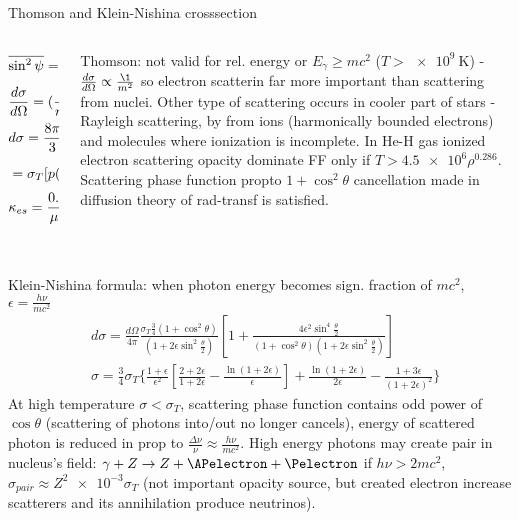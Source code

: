 \begin{frame}{Thomson and Klein-Nishina crosssection}
    \begin{columns}[T]
        \begin{column}{0.6\textwidth}
            \begin{align*}
                &\overline{\sin^2{\psi}}=1-\sin^2{\theta}\overline{cos^2{\phi}}=1-\frac{1}{2}\sin^2{\theta}\tag{unpol.}\\
                &\TDy{\Omega}{\sigma}=(\frac{e^2}{mc^2})^2 \frac{1}{2}(1+\cos^2{\theta})\tag{Thomson}\\
                &d\sigma=\frac{8\pi}{3}(\frac{e^2}{mc^2})^2p(\cos{\theta})\frac{d\Omega}{4\pi}\tag{Norm. scat. phase function}\\
                &=\sigma_T[p(\cos{\theta})\frac{d\Omega}{4\pi}],\sigma_T=\frac{8\pi}{3}(\frac{e^2}{mc^2})^2=\SI{0.665e-24}{\square\cm}\\
                &\kappa_{es}=\frac{0.4}{\mu_e}\approx0.2(1+X_H)\tag{complete ioniz.}\\
                &
            \end{align*}
        \end{column}
        \begin{column}{0.4\textwidth}
            Thomson: not valid for rel. energy or $E_{\gamma}\geq mc^2$ ($T>\SI{e9}{\kelvin}$) - $\TDy{\Omega}{\sigma}\propto \frac{\1}{m^2}$ so electron scatterin far more important than scattering from nuclei.
            Other type of scattering occurs in cooler part of stars - Rayleigh scattering, by from ions (harmonically bounded electrons) and molecules where ionization is incomplete. In He-H gas ionized electron scattering opacity dominate FF only if $T>\num{4.5e6}\rho^{0.286}$. Scattering phase function propto $1+\cos^2{\theta}$ cancellation made in diffusion theory of rad-transf is satisfied.
        \end{column}
    \end{columns}
    Klein-Nishina formula: when photon energy becomes sign. fraction of $mc^2$, $\epsilon=\frac{h\nu}{mc^2}$
    \begin{align*}
        &d\sigma=\frac{d\Omega}{4\pi}\frac{\sigma_T \frac{3}{4}(1+\cos^2{\theta})}{(1+2\epsilon\sin^2{\frac{\theta}{2}})}[1+\frac{4\epsilon^2\sin^4{\frac{\theta}{2}}}{(1+\cos^2{\theta})(1+2\epsilon\sin^2{\frac{\theta}{2}})}]\\
        &\sigma=\frac{3}{4}\sigma_T\{\frac{1+\epsilon}{\epsilon^2}[\frac{2+2\epsilon}{1+2\epsilon}-\frac{\ln{(1+2\epsilon)}}{\epsilon}]+\frac{\ln{(1+2\epsilon)}}{2\epsilon}-\frac{1+3\epsilon}{(1+2\epsilon)^2}\}
    \end{align*}
    At high temperature $\sigma<\sigma_T$, scattering phase function contains odd power of $\cos{\theta}$ (scattering of photons into/out no longer cancels), energy of scattered photon is reduced in prop to $\frac{\Delta\nu}{\nu}\approx \frac{h\nu}{mc^2}$.
    High energy photons may create \Pelectron\APelectron pair in nucleus's field: $\gamma+Z\to Z+\APelectron+\Pelectron$ if $h\nu>2mc^2$, $\sigma_{pair}\approx Z^2\num{e-3}\sigma_T$ (not important opacity source, but created electron increase scatterers and its annihilation produce neutrinos).
\end{frame}

